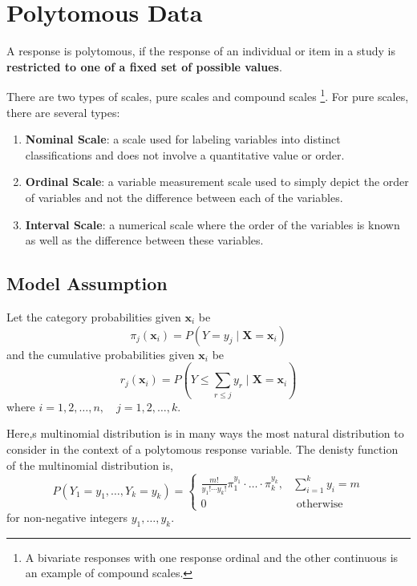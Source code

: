 \chapter{Polytomous Data}

\begin{definition}
    A response is polytomous, if the response of an individual or item in a study is \textbf{restricted to one of a fixed set of possible values}.
\end{definition}

\begin{remark}
    There are two types of scales, pure scales and compound scales \footnote{A bivariate responses with one response ordinal and the other continuous is an example of compound scales.}. For pure scales, there are several types:
    \begin{enumerate}
        \item \textbf{Nominal Scale}: a scale used for labeling variables into distinct classifications and does not involve a quantitative value or order.
        \item \textbf{Ordinal Scale}: a variable measurement scale used to simply depict the order of variables and not the difference between each of the variables.
        \item \textbf{Interval Scale}: a numerical scale where the order of the variables is known as well as the difference between these variables.
    \end{enumerate}
\end{remark}

\section{Model Assumption}

Let the category probabilities given $\mathbf{x}_{i}$ be
\begin{equation}
    \pi_{j}\left(\mathbf{x}_{i}\right)=P\left(Y=y_{j}\mid\mathbf{X}=\mathbf{x}_{i}\right)
\end{equation}
and the cumulative probabilities given $\mathbf{x}_{i}$ be
\begin{equation}
    r_{j}\left(\mathbf{x}_{i}\right)=P\left(Y\leq\sum_{r\leq j}y_{r}\mid\mathbf{X}=\mathbf{x}_{i}\right)
\end{equation}
where $i=1,2,\ldots,n,\quad j=1,2,\ldots,k$.

Here,s multinomial distribution is in many ways the most natural distribution to consider in the context of a polytomous response variable. The denisty function of the multinomial distribution is,
\begin{equation*}
    P\left(Y_{1}=y_{1},\ldots,Y_{k}=y_{k}\right)=
    \left\{\begin{array}{ll}
        \frac{m!}{y_{1}!\cdots y_{k}!}\pi_{1}^{y_{1}}\cdot\ldots\cdot \pi_{k}^{y_{k}}, & \sum_{i=1}^{k}y_{i}=m \\
        0                                                                          & \text { otherwise }
    \end{array}\right.
\end{equation*}
for non-negative integers $y_{1},\ldots,y_{k}$.

